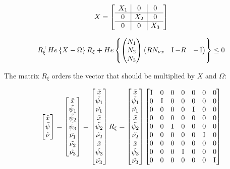 \documentclass{article}
\begin{document}
$$
  X = \left[\begin{matrix}
    \begin{array}{c|c|c}
      X_{1} & 0 & 0\\
      \hline
      0 & X_{2} & 0\\
      \hline
      0 & 0 & X_{3}
    \end{array}
  \end{matrix}\right]
$$
  
$$
R_{\xi}^\top He\left\{ X - \Omega \right\} R_{\xi} + He \left\{  \left(\begin{matrix}N_{1} \\ N_{2} \\ N_{3}\end{matrix}\right) \left(\begin{matrix}R N_{\nu x} & \operatorname{I} - R & -\operatorname{I}\end{matrix}\right) \right\} \leq 0
$$

The matrix $R_{\xi}$ orders the vector that should be multiplied by $X$ and $\Omega$:

$$
     \left[\begin{matrix}
      \tilde{x}\\
      \tilde{\psi}\\
      \tilde{\nu}
     \end{matrix}\right] = \left[\begin{matrix}
      \tilde{x}\\
      \tilde{\psi_{1}}\\
      \tilde{\psi_{2}}\\
      \tilde{\psi_{3}}\\
      \tilde{\nu_{1}}\\
      \tilde{\nu_{2}}\\
      \tilde{\nu_{3}}
    \end{matrix}\right] = \left[\begin{matrix}
      \tilde{x}\\
      \tilde{\psi_{1}}\\
      \tilde{\nu_{1}}\\
      \tilde{x}\\
      \tilde{\psi_{2}}\\
      \tilde{\nu_{2}}\\
      \tilde{x}\\
      \tilde{\psi_{3}}\\
      \tilde{\nu_{3}}
    \end{matrix}\right] R_{\xi} = \left[\begin{matrix}
      \tilde{x}\\
      \tilde{\psi_{1}}\\
      \tilde{\nu_{1}}\\
      \tilde{x}\\
      \tilde{\psi_{2}}\\
      \tilde{\nu_{2}}\\
      \tilde{x}\\
      \tilde{\psi_{3}}\\
      \tilde{\nu_{3}}
    \end{matrix}\right] \left[\begin{matrix}
      \operatorname{I} & 0 & 0 & 0 & 0 & 0 & 0\\
      0 & \operatorname{I} & 0 & 0 & 0 & 0 & 0\\
      0 & 0 & 0 & 0 & \operatorname{I} & 0 & 0\\
      0 & 0 & 0 & 0 & 0 & 0 & 0\\
      0 & 0 & \operatorname{I} & 0 & 0 & 0 & 0\\
      0 & 0 & 0 & 0 & 0 & \operatorname{I} & 0\\
      0 & 0 & 0 & 0 & 0 & 0 & 0\\
      0 & 0 & 0 & \operatorname{I} & 0 & 0 & 0\\
      0 & 0 & 0 & 0 & 0 & 0 & \operatorname{I}
    \end{matrix}\right] 
$$
\end{document}
